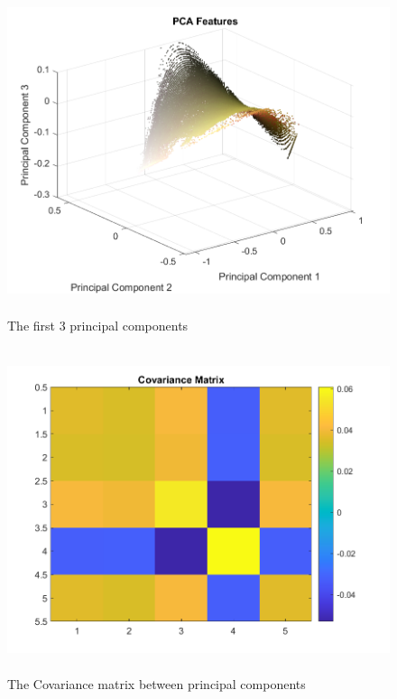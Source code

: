 \begin{enumerate}
        \begin{figure}[H]
    \centering
    \includegraphics[height=9.5cm, width=\textwidth, keepaspectratio]{Report/Images/Features/Lines/PCAFeatures3D.png}
    \caption{\label{fig:lines:pc 3d}The first 3 principal components}
    \end{figure}
    
    \begin{figure}[H]
    \centering
    \includegraphics[height=9.5cm, width=\textwidth, keepaspectratio]{Report/Images/Features/Lines/CovarianceMatrix.png}
    \caption{\label{fig:lines:cov}The Covariance matrix between principal components}
    \end{figure}


\end{enumerate}
